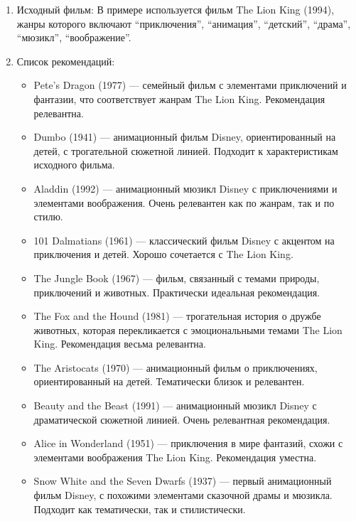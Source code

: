 \begin{enumerate}
\def\labelenumi{\arabic{enumi}.}
\item
  Исходный фильм: В примере используется фильм The Lion
  King (1994), жанры которого включают ``приключения'', ``анимация'',
  ``детский'', ``драма'', ``мюзикл'', ``воображение''.
\item
  Список рекомендаций:

  \begin{itemize}
  \tightlist
  \item
    Pete's Dragon (1977) --- семейный фильм с элементами
    приключений и фантазии, что соответствует жанрам The Lion
    King. Рекомендация релевантна.
  \item
    Dumbo (1941) --- анимационный фильм Disney, ориентированный
    на детей, с трогательной сюжетной линией. Подходит к характеристикам
    исходного фильма.
  \item
    Aladdin (1992) --- анимационный мюзикл Disney с
    приключениями и элементами воображения. Очень релевантен как по
    жанрам, так и по стилю.
  \item
    101 Dalmatians (1961) --- классический фильм Disney с
    акцентом на приключения и детей. Хорошо сочетается с The Lion
    King.
  \item
    The Jungle Book (1967) --- фильм, связанный с темами
    природы, приключений и животных. Практически идеальная рекомендация.
  \item
    The Fox and the Hound (1981) --- трогательная история о
    дружбе животных, которая перекликается с эмоциональными темами
    The Lion King. Рекомендация весьма релевантна.
  \item
    The Aristocats (1970) --- анимационный фильм о
    приключениях, ориентированный на детей. Тематически близок и
    релевантен.
  \item
    Beauty and the Beast (1991) --- анимационный мюзикл Disney
    с драматической сюжетной линией. Очень релевантная рекомендация.
  \item
    Alice in Wonderland (1951) --- приключения в мире фантазий,
    схожи с элементами воображения The Lion King. Рекомендация
    уместна.
  \item
    Snow White and the Seven Dwarfs (1937) --- первый
    анимационный фильм Disney, с похожими элементами сказочной драмы и
    мюзикла. Подходит как тематически, так и стилистически.
  \end{itemize}
\end{enumerate}

